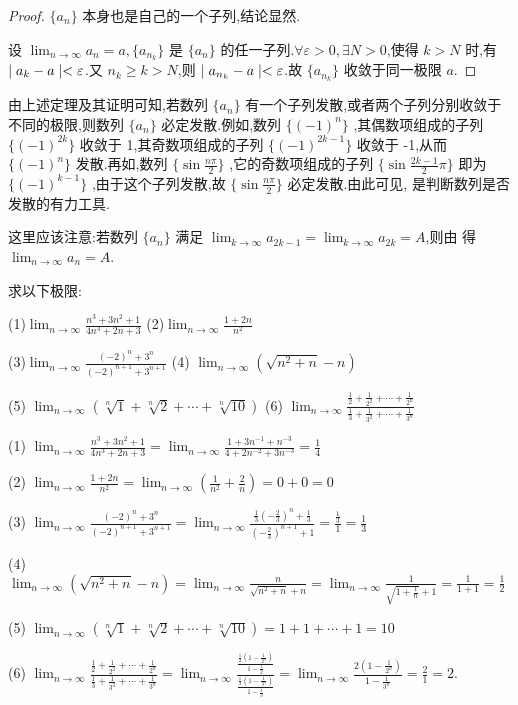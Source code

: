 \begin{proof}
    \chongfen $\{a_n\}$ 本身也是自己的一个子列,结论显然.

    \biyao 设 $\lim_{n\to\infty} a_n=a,\{a_{n_k}\}$ 是 $\{a_n\}$ 的任一子列.$\forall \varepsilon>0,\exists N>0 $,使得 $ k>N$ 时,有 $\mid a_k-a \mid<\varepsilon$.又 $n_k\ge k>N$,则 $\mid a_{n_k}-a \mid<\varepsilon$.故 $\{a_{n_k}\}$ 收敛于同一极限 $a$.
\end{proof}

由上述定理及其证明可知,若数列 $\{a_n\}$ 有一个子列发散,或者两个子列分别收敛于不同的极限,则数列 $\{a_n\}$ 必定发散.例如,数列 $\{(-1)^n\}$ ,其偶数项组成的子列 $\{(-1)^{2k}\}$ 收敛于 1,其奇数项组成的子列 $\{(-1)^{2k-1}\}$ 收敛于 -1,从而 $\{(-1)^n\}$ 发散.再如,数列 $\{\sin \frac{n\pi}{2}\}$ ,它的奇数项组成的子列 $\{\sin \frac{2k-1}{2}\pi\}$ 即为 $\{(-1)^{k-1}\}$ ,由于这个子列发散,故 $\{\sin \frac{n\pi}{2}\}$ 必定发散.由此可见, 是判断数列是否发散的有力工具.

这里应该注意:若数列 $\{a_n\}$ 满足 $\lim_{k\to\infty} a_{2k-1}=\lim_{k\to\infty} a_{2k}=A$,则由 得 $\lim_{n\to\infty} a_n=A$.

\homework

\begin{practice}
    求以下极限:

    (1)$\lim_{n\to\infty} \frac{n^3+3n^2+1}{4n^3+2n+3}$ \qquad (2)$\lim_{n\to\infty} \frac{1+2n}{n^2}$

    (3)$\lim_{n\to\infty} \frac{(-2)^n+3^n}{(-2)^{n+1}+3^{n+1}}$ \qquad (4) $\lim_{n\to\infty} (\sqrt{n^2+n}-n)$

    (5) $\lim_{n\to\infty} (\sqrt[n]{1}+\sqrt[n]{2}+\cdots+\sqrt[n]{10})$
    \qquad(6) $\lim_{n\to\infty} \frac{\frac{1}{2}+\frac{1}{2^2}+\cdots+\frac{1}{2^n}}{\frac{1}{3}+\frac{1}{3^2}+\cdots+\frac{1}{3^n}}$
\end{practice}

\begin{solve}
    (1) $\lim_{n\to\infty} \frac{n^3+3n^2+1}{4n^3+2n+3}=\lim_{n\to\infty} \frac{1+3n^{-1}+n^{-3}}{4+2n^{-2}+3n^{-3}}=\frac{1}{4}$

    (2) $\lim_{n\to\infty} \frac{1+2n}{n^2}=\lim_{n\to\infty}(\frac{1}{n^2}+\frac{2}{n})=0+0=0$

    (3) $\lim_{n\to\infty} \frac{(-2)^n+3^n}{(-2)^{n+1}+3^{n+1}}=\lim_{n\to\infty} \frac{\frac{1}{3}(-\frac{2}{3})^n+\frac{1}{3}}{(-\frac{2}{3})^{n+1}+1}=\frac{\frac{1}{3}}{1}=\frac{1}{3}$

    (4)$\lim_{n\to\infty} (\sqrt{n^2+n}-n)=\lim_{n\to\infty}\frac{n}{\sqrt{n^2+n}+n}=\lim_{n\to\infty}\frac{1}{\sqrt{1+\frac{1}{n}}+1}=\frac{1}{1+1}=\frac{1}{2}$

    (5) $\lim_{n\to\infty} (\sqrt[n]{1}+\sqrt[n]{2}+\cdots+\sqrt[n]{10})=1+1+\cdots+1=10$

    (6) $\lim_{n\to\infty} \frac{\frac{1}{2}+\frac{1}{2^2}+\cdots+\frac{1}{2^n}}{\frac{1}{3}+\frac{1}{3^2}+\cdots+\frac{1}{3^n}}=\lim_{n\to\infty} \frac{\frac{\frac{1}{2}(1-\frac{1}{2^n})}{1-\frac{1}{2}}}{\frac{\frac{1}{3}(1-\frac{1}{3^n})}{1-\frac{1}{3}}}=\lim_{n\to\infty} \frac{2(1-\frac{1}{2^n})}{1-\frac{1}{3^n}}=\frac{2}{1}=2$.
\end{solve}

